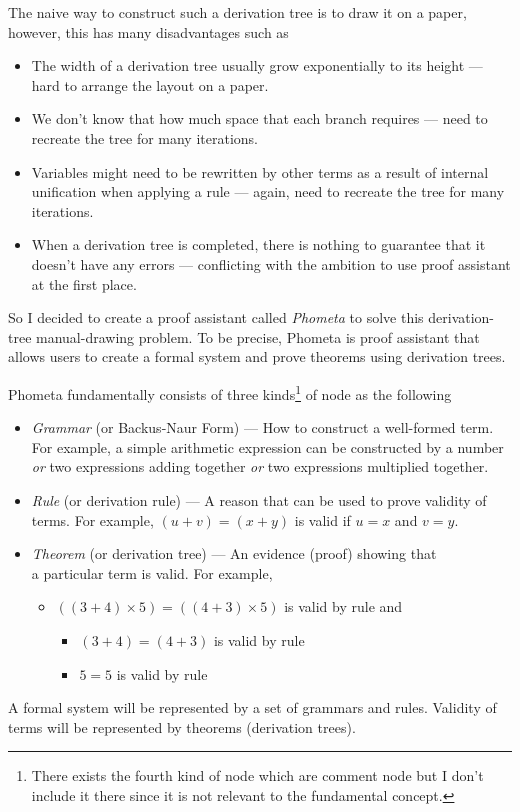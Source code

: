 \documentclass[master.tex]{subfiles}
\begin{document}
The naive way to construct such a derivation tree is to draw it on a paper,
however, this has many disadvantages such as
\begin{itemize}
\item The width of a derivation tree usually grow exponentially to its height ---
  hard to arrange the layout on a paper.
\item We don't know that how much space that each branch requires --- need to
  recreate the tree for many iterations.
\item Variables might need to be rewritten by other terms as a result of
  internal unification when applying a rule --- again, need to recreate the tree
  for many iterations.
\item When a derivation tree is completed, there is nothing to guarantee that it
  doesn't have any errors --- conflicting with the ambition to use proof
  assistant at the first place.
\end{itemize}
So I decided to create a proof assistant called \emph{Phometa} to solve this
derivation-tree manual-drawing problem. To be precise, Phometa is proof
assistant that allows users to create a formal system and prove theorems using
derivation trees.

Phometa fundamentally consists of three kinds\footnote{There exists the fourth
  kind of node which are comment node but I don't include it there since it is
  not relevant to the fundamental concept.} of node as the following
\begin{itemize}
\item \emph{Grammar} (or Backus-Naur Form) --- How to construct a well-formed
  term.\\ For example, a simple arithmetic expression can be constructed by a
  number \emph{or} two expressions adding together \emph{or} two expressions
  multiplied together.
\item \emph{Rule} (or derivation rule) --- A reason that can be used to prove
  validity of terms. For example, $(u + v) = (x + y)$ is valid if $u = x$ and $v
  = y$.
\item \emph{Theorem} (or derivation tree) --- An evidence (proof) showing that \\
  a particular term is valid. For example,
  \begin{itemize}
  \item[] $((3 + 4) \times 5) = ((4 + 3) \times 5)$ is valid by rule
     and
    \begin{itemize}
    \item[] $(3 + 4) = (4 + 3)$ is valid by rule 
    \item[] $5 = 5$ is valid by rule 
    \end{itemize}
  \end{itemize}
\end{itemize}
A formal system will be represented by a set of grammars and rules. Validity of
terms will be represented by theorems (derivation trees).
\end{document}
